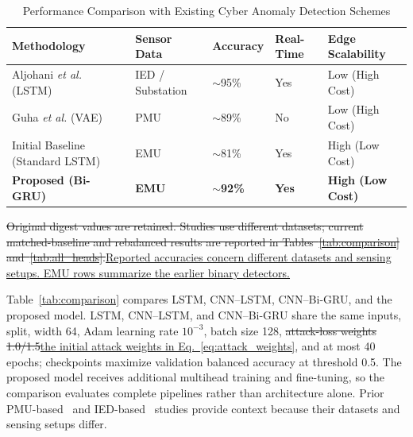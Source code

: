 \documentclass[conference,letterpaper]{IEEEtran}
\providecommand{\DIFadd}[1]{{\protect\color{blue}\uline{#1}}} %
\providecommand{\DIFdel}[1]{{\protect\color{red}\sout{#1}}}                      %
\providecommand{\DIFaddbegin}{} %
\providecommand{\DIFaddend}{} %
\providecommand{\DIFdelbegin}{} %
\providecommand{\DIFdelend}{} %
\providecommand{\DIFaddFL}[1]{\DIFadd{#1}} %
\providecommand{\DIFdelFL}[1]{\DIFdel{#1}} %
\providecommand{\DIFaddbeginFL}{} %
\providecommand{\DIFaddendFL}{} %
\providecommand{\DIFdelbeginFL}{} %
\providecommand{\DIFdelendFL}{} %
\begin{document}
\DIFaddend
\begin{table}[!t]
\centering
\caption{Performance Comparison with Existing Cyber Anomaly Detection Schemes}
\label{tab:prior_work}
\small
\setlength{\tabcolsep}{2pt}
\begin{tabular}{|p{.245\linewidth}|>{\centering\arraybackslash}p{.17\linewidth}|>{\centering\arraybackslash}p{.15\linewidth}|>{\centering\arraybackslash}p{.115\linewidth}|>{\centering\arraybackslash}p{.20\linewidth}|}
\hline
\textbf{Methodology} & \textbf{Sensor Data} & \textbf{Accuracy} & \textbf{Real-Time} & \textbf{Edge Scalability} \\
\hline
Aljohani \textit{et al.} \cite{aljohani2024} (LSTM) & IED / Substation & $\sim$95\% & Yes & Low (High Cost) \\
\hline
Guha \textit{et al.} \cite{guha} (VAE) & PMU & $\sim$89\% & No & Low (High Cost) \\
\hline
Initial Baseline (Standard LSTM) & EMU & $\sim$81\% & Yes & High (Low Cost) \\
\hline
\textbf{Proposed (Bi-GRU)} & \textbf{EMU} & \textbf{$\sim$92\%} & \textbf{Yes} & \textbf{High (Low Cost)} \\
\hline
\end{tabular}
\par\vspace{2pt}
\begin{minipage}{\linewidth}\footnotesize \DIFdelbeginFL \DIFdelFL{Original digest values are retained. Studies use different datasets; current matched-baseline and rebalanced results are reported in Tables~\ref{tab:comparison} and~\ref{tab:all_heads}.}\DIFdelendFL \DIFaddbeginFL \DIFaddFL{Reported accuracies concern different datasets and sensing setups. EMU rows summarize the earlier binary detectors.}\DIFaddendFL \end{minipage}
\end{table}
\DIFaddbegin
\DIFaddend

Table~\ref{tab:comparison} compares LSTM, CNN--LSTM, CNN--Bi-GRU, and the proposed model. LSTM, CNN--LSTM, and CNN--Bi-GRU share the same inputs, split, width 64, Adam learning rate $10^{-3}$, batch size 128, \DIFdelbegin \DIFdel{attack-loss weights 1.0/1.5}\DIFdelend \DIFaddbegin \DIFadd{the initial attack weights in Eq.~\ref{eq:attack_weights}}\DIFaddend , and at most 40 epochs; checkpoints maximize validation balanced accuracy at threshold 0.5. The proposed model receives additional multihead training and fine-tuning, so the comparison evaluates complete pipelines rather than architecture alone. Prior PMU-based~\cite{guha} and IED-based~\cite{aljohani2024} studies provide context because their datasets and sensing setups differ.
\end{document}
